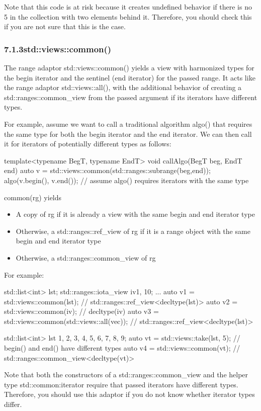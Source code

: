 Note that this code is at risk because it creates undefined behavior if there is no 5 in the collection with two elements behind it. Therefore, you should check this if you are not sure that this is the case.

\subsubsection*{ 7.1.3\hspace{0.2cm}std::views::common()}

The range adaptor std::views::common() yields a view with harmonized types for the begin iterator and the sentinel (end iterator) for the passed range. It acts like the range adaptor std::views::all(), with the additional behavior of creating a std::ranges::common\_view from the passed argument if its iterators have different types.

For example, assume we want to call a traditional algorithm algo() that requires the same type for both the begin iterator and the end iterator. We can then call it for iterators of potentially different types as follows:

\begin{cpp}
template<typename BegT, typename EndT>
void callAlgo(BegT beg, EndT end)
{
	auto v = std::views::common(std::ranges::subrange(beg,end));
	algo(v.begin(), v.end()); // assume algo() requires iterators with the same type
}
\end{cpp}

common(rg) yields

\begin{itemize}
\item
A copy of rg if it is already a view with the same begin and end iterator type

\item
Otherwise, a std::ranges::ref\_view of rg if it is a range object with the same begin and end iterator type

\item
Otherwise, a std::ranges::common\_view of rg
\end{itemize}

For example:

\begin{cpp}
std::list<int> lst;
std::ranges::iota_view iv{1, 10};
...
auto v1 = std::views::common(lst); // std::ranges::ref_view<decltype(lst)>
auto v2 = std::views::common(iv); // decltype(iv)
auto v3 = std::views::common(std::views::all(vec));
			// std::ranges::ref_view<decltype(lst)>
			
std::list<int> lst {1, 2, 3, 4, 5, 6, 7, 8, 9};
auto vt = std::views::take(lst, 5); // begin() and end() have different types
auto v4 = std::views::common(vt); // std::ranges::common_view<decltype(vt)>
\end{cpp}

Note that both the constructors of a std::ranges::common\_view and the helper type std::common:iterator require that passed iterators have different types. Therefore, you should use this adaptor if you do not know whether iterator types differ.












